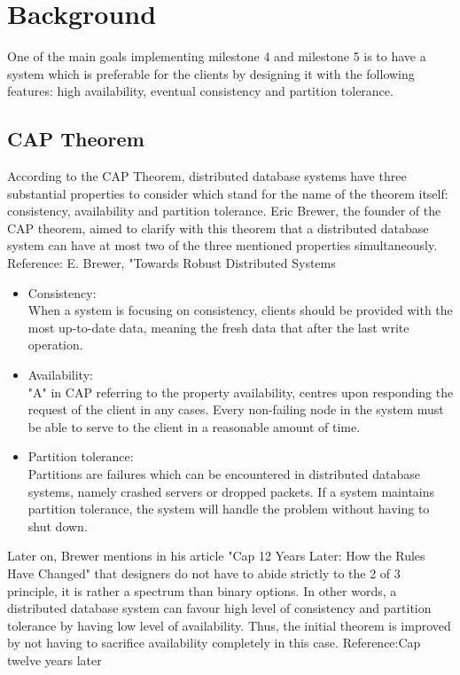 \section{Background}
\label{sec:background}
One of the main goals implementing milestone 4 and milestone 5 is to have a system which is preferable for the clients by designing it with the following features: high availability, eventual consistency and partition tolerance.

\subsection{CAP Theorem}
\label{sec:backgorund_cap}  %
According to the CAP Theorem, distributed database systems have three substantial properties to consider which stand for the name of the theorem itself: consistency, availability and partition tolerance. Eric Brewer, the founder of the CAP theorem, aimed to clarify with this theorem that a distributed database system can have at most two of the three mentioned properties simultaneously. Reference: E. Brewer, "Towards Robust Distributed Systems

\begin{itemize}
  \item Consistency: \\
  When a system is focusing on consistency, clients should be provided with the most up-to-date data, meaning the fresh data that after the last write operation.
  \item Availability:\\
  "A" in CAP referring to the property availability, centres upon responding the request of the client in any cases. Every non-failing node in the system must be able to serve to the client in a reasonable amount of time.
  \item Partition tolerance:\\
Partitions are failures which can be encountered in distributed database systems, namely crashed servers or dropped packets. If a system maintains partition tolerance, the system will handle the problem without having to shut down.
\end{itemize}

Later on, Brewer mentions in his article "Cap 12 Years Later: How the Rules Have Changed" that designers do not have to abide strictly to the 2 of 3 principle, it is rather a spectrum than binary options. In other words, a distributed database system can favour high level of consistency and partition tolerance by having low level of availability. Thus, the initial theorem is improved by not having to sacrifice availability completely in this case. Reference:Cap twelve years later

